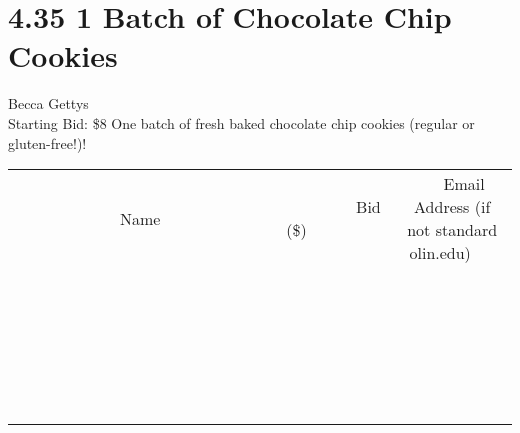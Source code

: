 \documentclass[11pt]{article}
\begin{document}
\section*{4.35 1 Batch of Chocolate Chip  Cookies}
Becca Gettys
\\
Starting Bid: \$8
\newline
One batch of fresh baked chocolate chip cookies (regular or gluten-free!)!
\\[6ex]
\begin{tabular}{c c c}
~~~~~~~~~~~~~Name~~~~~~~~~~~~~ & ~~~~~~~~~Bid (\$)~~~~~~~~~  & ~~~Email Address (if not standard olin.edu)~~~\\
 & & \\
\hline
 & & \\
\hline
 & & \\
\hline
 & & \\
\hline
 & & \\
\hline
 & & \\
\hline
 & & \\
\hline
 & & \\
\hline
 & & \\
\hline
 & & \\
\hline
 & & \\
\hline
 & & \\
\hline
 & & \\
\hline
 & & \\
\hline
 & & \\
\hline
 & & \\
\hline
 & & \\
\hline
 & & \\
\hline
 & & \\
\hline
 & & \\
\hline
 & & \\
\hline
 & & \\
\hline
 & & \\
\hline
 & & \\
\hline
 & & \\
\hline
 & & \\
\hline
\end{tabular}
\newpage
\end{document}
